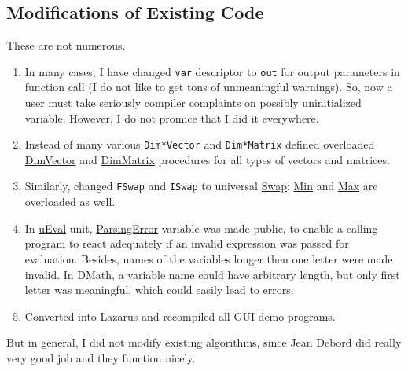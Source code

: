 \documentclass[12pt,a4paper,oneside]{report}
\newcommand{\code}[1]{\texttt{#1}}
\begin{document}
\subsection*{Modifications of Existing Code}  
These are not numerous. 
\begin{enumerate}
\item In many cases, I have changed \code{var} descriptor to \code{out} for output parameters in function call (I do not like to get tons of unmeaningful warnings). So, now a user must take seriously compiler complaints on possibly uninitialized variable. However, I do not promice that I did it everywhere.
\item Instead of many various \code{Dim*Vector} and \code{Dim*Matrix} defined overloaded \hyperref[utypes-DimVector]{DimVector} and \hyperref[utypes-DimMatrix]{DimMatrix} procedures for all types of vectors and matrices.
\item Similarly, changed \code{FSwap} and \code{ISwap} to universal \hyperref[uminmax-Swap]{Swap}; \hyperref[uminmax-Min]{Min} and \hyperref[uminmax-Min]{Max} are overloaded as well.
\item In \hyperref[ueval]{uEval} unit, \hyperref[ueval-parsingerror]{ParsingError} variable was made public, to enable a calling program to react adequately if an invalid expression was passed for evaluation. Besides, names of the variables longer then one letter were made invalid. In DMath, a variable name could have arbitrary length, but only first letter was meaningful, which could easily lead to errors.
\item Converted into Lazarus and recompiled all GUI demo programs.
\end{enumerate}
But in general, I did not modify existing algorithms, since Jean Debord did really very good job and they function nicely.
\end{document}
